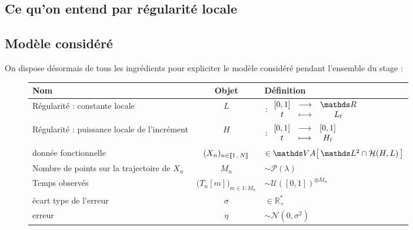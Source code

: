 \subsection{Ce qu'on entend par régularité locale}




\subsection{Modèle considéré}

On dispose désormais de tous les ingrédients pour expliciter le modèle considéré pendant l'ensemble du stage :

\begin{figure}[H]
	\noindent\begin{tabularx}{\textwidth}{XcX}
		\toprule
		\textbf{Nom}                                 & \textbf{Objet}                     & \textbf{Définition}                            \\
		\midrule
		Régularité : constante locale                & $L$                                & $: \func{[0,1]}{\mathds R}{t}{L_t}$            \\
		Régularité : puissance locale de l'incrément & $H$                                & $: \begin{array}{ccc} [0,1] &\longrightarrow& [0,1] \\ t &\longmapsto& H_t \end{array}$                \\
		donnée fonctionnelle                         & $(X_n)_{n \in \llbracket 1 \, , \, N \rrbracket}$  & $\in \VA{ \mathds L^2 \cap \mathcal H(H, L) }$ \\
		\midrule
		Nombre de points sur la trajectoire de $X_n$ & $M_n$                              & $\sim \mathcal P(\lambda)$                     \\
		Temps observés                               & $\bigl(T_n[m]\bigr)_{m \in 1:M_n}$ & $\sim \mathcal U( [0,1] )^{\otimes M_n}$       \\
		\midrule
		écart type de l'erreur                       & $\sigma$                           & $\in \mathds R_+^*$                            \\
		erreur                                       & $\eta$                             & $\sim \mathcal N(0, \sigma^2)$                 \\
		\bottomrule
	\end{tabularx}
\end{figure}
